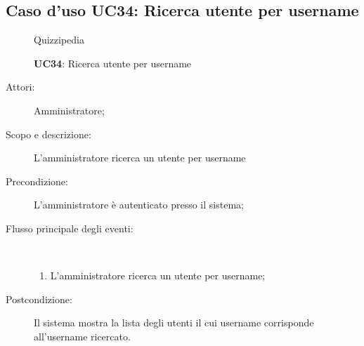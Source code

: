 \subsection{Caso d'uso UC34: Ricerca utente per username}
	\begin{figure}[H]
		\centering
		\begin{resizedtikzpicture}{\textwidth}
		\begin{umlsystem}[x=0, fill=lightgray!20]{Quizzipedia}
		\end{umlsystem}
		\end{resizedtikzpicture}
		\caption{\textbf{UC34}: Ricerca utente per username}
		\label{UC34}
	\end{figure}
\begin{description}
\item[Attori:] Amministratore;
\item[Scopo e descrizione:] L'amministratore ricerca un utente per username
      \item[Precondizione:] L'amministratore è autenticato presso il sistema;

        \item[Flusso principale degli eventi:] \ 
 \begin{enumerate}
          \item L'amministratore ricerca un utente per username;

      \end{enumerate}
    \item[Postcondizione:] Il sistema mostra la lista degli utenti il cui username corrisponde all'username ricercato.
  \end{description}
\hypertarget{UC35}{}

